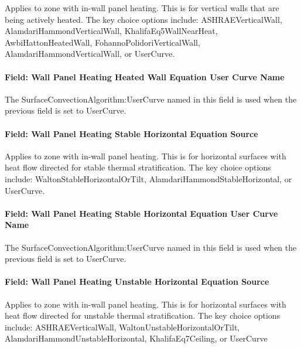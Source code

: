 Applies to zone with in-wall panel heating. This is for vertical walls that are being actively heated. The key choice options include: ASHRAEVerticalWall, AlamdariHammondVerticalWall, KhalifaEq5WallNearHeat, AwbiHattonHeatedWall, FohannoPolidoriVerticalWall, AlamdariHammondVerticalWall, or UserCurve.

\paragraph{Field: Wall Panel Heating Heated Wall Equation User Curve Name}\label{field-wall-panel-heating-heated-wall-equation-user-curve-name}

The SurfaceConvectionAlgorithm:UserCurve named in this field is used when the previous field is set to UserCurve.

\paragraph{Field: Wall Panel Heating Stable Horizontal Equation Source}\label{field-wall-panel-heating-stable-horizontal-equation-source}

Applies to zone with in-wall panel heating. This is for horizontal surfaces with heat flow directed for stable thermal stratification. The key choice options include: WaltonStableHorizontalOrTilt, AlamdariHammondStableHorizontal, or UserCurve.

\paragraph{Field: Wall Panel Heating Stable Horizontal Equation User Curve Name}\label{field-wall-panel-heating-stable-horizontal-equation-user-curve-name}

The SurfaceConvectionAlgorithm:UserCurve named in this field is used when the previous field is set to UserCurve.

\paragraph{Field: Wall Panel Heating Unstable Horizontal Equation Source}\label{field-wall-panel-heating-unstable-horizontal-equation-source}

Applies to zone with in-wall panel heating. This is for horizontal surfaces with heat flow directed for unstable thermal stratification. The key choice options include: ASHRAEVerticalWall, WaltonUnstableHorizontalOrTilt, AlamdariHammondUnstableHorizontal, KhalifaEq7Ceiling, or UserCurve

